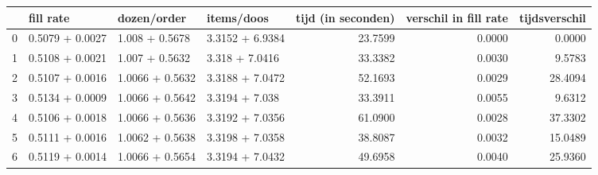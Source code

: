 \begin{tabular}{llllrrr}
\toprule
{} &        fill rate &      dozen/order &       items/doos &  tijd (in seconden) &  verschil in fill rate &  tijdsverschil \\
\midrule
0 &  0.5079 + 0.0027 &   1.008 + 0.5678 &  3.3152 + 6.9384 &             23.7599 &                 0.0000 &         0.0000 \\
1 &  0.5108 + 0.0021 &   1.007 + 0.5632 &   3.318 + 7.0416 &             33.3382 &                 0.0030 &         9.5783 \\
2 &  0.5107 + 0.0016 &  1.0066 + 0.5632 &  3.3188 + 7.0472 &             52.1693 &                 0.0029 &        28.4094 \\
3 &  0.5134 + 0.0009 &  1.0066 + 0.5642 &   3.3194 + 7.038 &             33.3911 &                 0.0055 &         9.6312 \\
4 &  0.5106 + 0.0018 &  1.0066 + 0.5636 &  3.3192 + 7.0356 &             61.0900 &                 0.0028 &        37.3302 \\
5 &  0.5111 + 0.0016 &  1.0062 + 0.5638 &  3.3198 + 7.0358 &             38.8087 &                 0.0032 &        15.0489 \\
6 &  0.5119 + 0.0014 &  1.0066 + 0.5654 &  3.3194 + 7.0432 &             49.6958 &                 0.0040 &        25.9360 \\
\bottomrule
\end{tabular}
